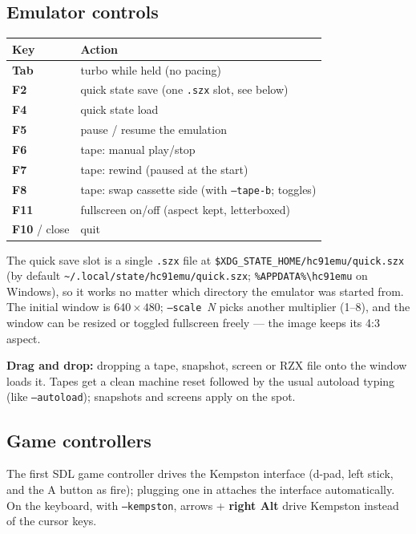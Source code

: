 \documentclass[11pt,a4paper]{article}
\newcommand{\opt}[1]{\texttt{#1}}
\newcommand{\key}[1]{\textsf{\textbf{#1}}}
\begin{document}
\subsection{Emulator controls}

\begin{tabularx}{\textwidth}{lX}
\toprule
\textbf{Key} & \textbf{Action} \\
\midrule
\key{Tab} & turbo while held (no pacing) \\
\key{F2} & quick state save (one \texttt{.szx} slot, see below) \\
\key{F4} & quick state load \\
\key{F5} & pause / resume the emulation \\
\key{F6} & tape: manual play/stop \\
\key{F7} & tape: rewind (paused at the start) \\
\key{F8} & tape: swap cassette side (with \opt{--tape-b}; toggles) \\
\key{F11} & fullscreen on/off (aspect kept, letterboxed) \\
\key{F10} / close & quit \\
\bottomrule
\end{tabularx}

The quick save slot is a single \texttt{.szx} file at
\texttt{\$XDG\_STATE\_HOME/hc91emu/quick.szx} (by default
\texttt{\textasciitilde/.local/state/hc91emu/quick.szx};
\texttt{\%APPDATA\%\textbackslash hc91emu} on Windows), so it works no
matter which directory the emulator was started from. The initial
window is $640\times480$; \opt{--scale}~\textit{N} picks another
multiplier (1--8), and the window can be resized or toggled
fullscreen freely --- the image keeps its 4:3 aspect.

\textbf{Drag and drop:} dropping a tape, snapshot, screen or RZX file
onto the window loads it. Tapes get a clean machine reset followed by
the usual autoload typing (like \opt{--autoload}); snapshots and
screens apply on the spot.

\subsection{Game controllers}

The first SDL game controller drives the Kempston interface (d-pad,
left stick, and the A button as fire); plugging one in attaches the
interface automatically. On the keyboard, with \opt{--kempston},
arrows + \key{right Alt} drive Kempston instead of the cursor keys.
\end{document}
